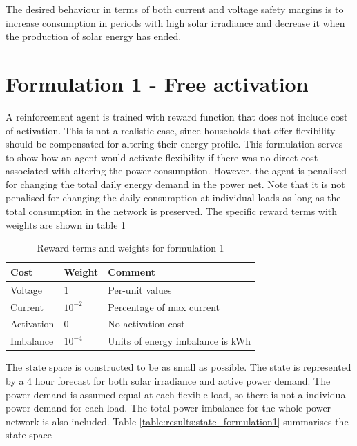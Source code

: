 \documentclass[class=book, crop=false]{standalone}
\begin{document}
The desired behaviour in terms of both current and voltage safety margins is to increase consumption in periods with high solar irradiance and decrease it when the production of solar energy has ended.


\section{Formulation 1 - Free activation}
A reinforcement agent is trained with reward function that does not include cost of activation. This is not a realistic case, since households that offer flexibility should be compensated for altering their energy profile. This formulation serves to show how an agent would activate flexibility if there was no direct cost associated with altering the power consumption. However, the agent is penalised for changing the total daily energy demand in the power net. Note that it is not penalised for changing the daily consumption at individual loads as long as the total consumption in the network is preserved. The specific reward terms with weights are shown in table \ref{table:results:reward_formulation1}

\begin{table}[ht]
\centering
\begin{tabular}{l|ll}

Cost  & Weight & Comment
\\ 
\hline
Voltage &
1 &
Per-unit values
\\
Current &
$10^{-2}$ &
Percentage of max current 
\\
Activation &
0&
No activation cost
\\
Imbalance &
$10^{-4}$&
Units of energy imbalance is kWh
\\
\hline
\end{tabular}
\caption{Reward terms and weights for formulation 1}
\label{table:results:reward_formulation1}
\end{table}
The state space is constructed to be as small as possible. The state is represented by a 4 hour forecast for both solar irradiance and active power demand. The power demand is assumed equal at each flexible load, so there is not a individual power demand for each load. The total power imbalance for the whole power network is also included. Table \ref{table:results:state_formulation1} summarises the state space
\end{document}
